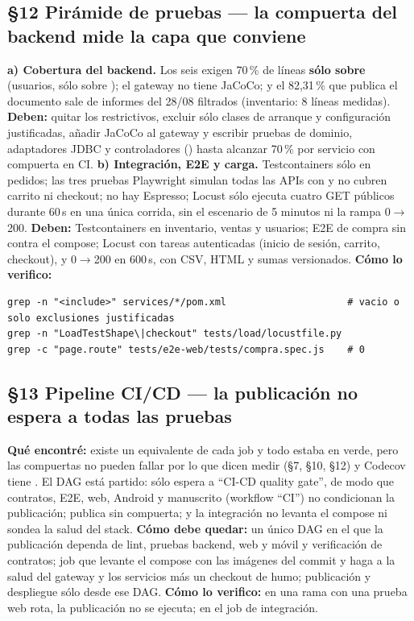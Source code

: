 \subsection*{\S12 Pir\'amide de pruebas --- la compuerta del backend mide la capa que conviene}
\textbf{a) Cobertura del backend.} Los seis  exigen 70\,\% de l\'ineas \textbf{s\'olo sobre } (usuarios, s\'olo sobre ); el gateway no tiene JaCoCo; y el 82,31\,\% que publica el documento sale de informes del 28/08 filtrados (inventario: 8 l\'ineas medidas). \textbf{Deben:} quitar los  restrictivos, excluir s\'olo clases de arranque y configuraci\'on justificadas, a\~nadir JaCoCo al gateway y escribir pruebas de dominio, adaptadores JDBC y controladores () hasta alcanzar 70\,\% por servicio con compuerta en CI. \textbf{b) Integraci\'on, E2E y carga.} Testcontainers s\'olo en pedidos; las tres pruebas Playwright simulan todas las APIs con  y no cubren carrito ni checkout; no hay Espresso; Locust s\'olo ejecuta cuatro GET p\'ublicos durante 60\,s en una \'unica corrida, sin el escenario de 5 minutos ni la rampa 0$\rightarrow$200. \textbf{Deben:} Testcontainers en inventario, ventas y usuarios; E2E de compra sin  contra el compose; Locust con tareas autenticadas (inicio de sesi\'on, carrito, checkout),  y  0$\rightarrow$200 en 600\,s, con CSV, HTML y sumas versionados. \textbf{C\'omo lo verifico:}\begin{verbatim}
grep -n "<include>" services/*/pom.xml                     # vacio o solo exclusiones justificadas
grep -n "LoadTestShape\|checkout" tests/load/locustfile.py
grep -c "page.route" tests/e2e-web/tests/compra.spec.js    # 0
\end{verbatim}

\subsection*{\S13 Pipeline CI/CD --- la publicaci\'on no espera a todas las pruebas}
\textbf{Qu\'e encontr\'e:} existe un equivalente de cada job y todo estaba en verde, pero las compuertas no pueden fallar por lo que dicen medir (\S7, \S10, \S12) y Codecov tiene . El DAG est\'a partido:  s\'olo espera a ``CI-CD quality gate'', de modo que contratos, E2E, web, Android y manuscrito (workflow ``CI'') no condicionan la publicaci\'on;  publica sin compuerta; y la integraci\'on no levanta el compose ni sondea la salud del stack. \textbf{C\'omo debe quedar:} un \'unico DAG en el que la publicaci\'on dependa de lint, pruebas backend, web y m\'ovil y verificaci\'on de contratos; job  que levante el compose con las im\'agenes del commit y haga  a la salud del gateway y los servicios m\'as un checkout de humo; publicaci\'on y despliegue s\'olo desde ese DAG. \textbf{C\'omo lo verifico:} en una rama con una prueba web rota, la publicaci\'on no se ejecuta;  en el job de integraci\'on.


